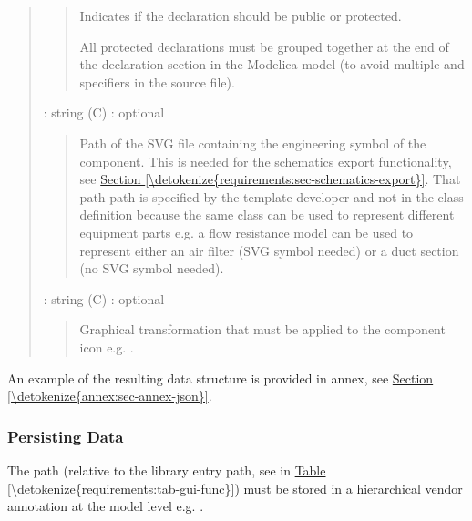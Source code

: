 \documentclass[letterpaper,10pt, openany,english]{sphinxmanual}
\begin{document}
\begin{quote}
\begin{quote}
\begin{DUlineblock}{0em}
\item[] Indicates if the declaration should be public or protected.
\item[] All protected declarations must be grouped together at the end of the declaration section in the Modelica model (to avoid multiple  and  specifiers in the source file).
\end{DUlineblock}
\end{quote}

 : string (C) : optional
\begin{quote}

Path of the SVG file containing the engineering symbol of the component. This is needed for the schematics export functionality, see \hyperref[\detokenize{requirements:sec-schematics-export}]{Section \ref{\detokenize{requirements:sec-schematics-export}}}. That path path is specified by the template developer and not in the class definition because the same class can be used to represent different equipment parts e.g. a flow resistance model can be used to represent either an air filter (SVG symbol needed) or a duct section (no SVG symbol needed).
\end{quote}

 : string (C) : optional
\begin{quote}

Graphical transformation that must be applied to the component icon e.g. .
\end{quote}
\end{quote}

An example of the resulting data structure is provided in annex, see \hyperref[\detokenize{annex:sec-annex-json}]{Section \ref{\detokenize{annex:sec-annex-json}}}.


\subsubsection{Persisting Data}
\label{\detokenize{requirements:persisting-data}}\label{\detokenize{requirements:sec-persisting-data}}

The path (relative to the library entry path, see  in \hyperref[\detokenize{requirements:tab-gui-func}]{Table \ref{\detokenize{requirements:tab-gui-func}}}) must be stored in a hierarchical vendor annotation at the model level e.g. .
\end{document}
